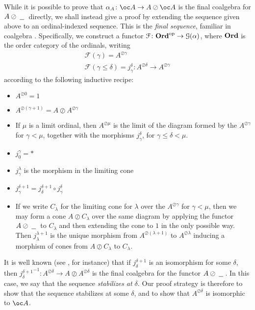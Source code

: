 \documentclass[a4paper,UKenglish]{lipics-v2016}
\theoremstyle{plain}
\theoremstyle{definition}
\newcommand*\from{\colon}
\def \inv {^{-1}}
\newcommand{\sequoid}{\oslash}
\newcommand{\comp}[2]{#1 \circ #2}
\newcommand{\F}{\mathcal F}
\newcommand{\G}{\mathcal G}
\newcommand{\blank}{\;\underline{\hspace{1.5ex}}\;}
\newcommand{\catname}[1]{{\normalfont\textbf{#1}}}
\newcommand{\Ord}{\catname{Ord}}
\newcommand\oppcat[1]{#1^{\mathrm{op}}}
\begin{document}
While it is possible to prove that $\alpha_A\from \oc A\to A\sequoid \oc A$ is the final coalgebra for $A\sequoid\blank$ directly, we shall instead give a proof by extending the sequence given above to an ordinal-indexed sequence.  This is the \emph{final sequence}, familiar in coalgebra \cite{finalseq}.  Specifically, we construct a functor $\F\from\oppcat{\Ord}\to\G(\alpha)$, where $\Ord$ is the order category of the ordinals, writing
\begin{gather*}
  \F(\gamma)=A^{\sequoid\gamma}\\
  \F(\gamma\le\delta)=j_\gamma^\delta\from A^{\sequoid\delta}\to A^{\sequoid\gamma}
\end{gather*}
according to the following inductive recipe:
\begin{itemize}
  \item $A^{\sequoid 0} = 1$
  \item $A^{\sequoid (\gamma + 1)} = A \sequoid A^{\sequoid\gamma}$
  \item If $\mu$ is a limit ordinal, then $A^{\sequoid\mu}$ is the limit of the diagram formed by the $A^{\sequoid\gamma}$ for $\gamma<\mu$, together with the morphisms $j_\gamma^\delta$, for $\gamma\le\delta<\mu$.
  \item $j_0^\gamma=*$
  \item $j_\gamma^\lambda$ is the morphism in the limiting cone
  \item $j_\gamma^{\delta+1} = \comp{j_\delta^{\delta+1}}{j_\gamma^\delta}$
  \item If we write $C_\lambda$ for the limiting cone for $\lambda$ over the $A^{\sequoid\gamma}$ for $\gamma<\mu$, then we may form a cone $A\sequoid C_\lambda$ over the same diagram by applying the functor $A\sequoid\blank$ to $C_\lambda$ and then extending the cone to $1$ in the only possible way.  Then $j_\lambda^{\lambda+1}$ is the unique morphism from $A^{\sequoid(\lambda+1)}$ to $A^{\sequoid\lambda}$ inducing a morphism of cones from $A\sequoid C_\lambda$ to $C_\lambda$.
\end{itemize}

It is well known (see \cite{finalseq}, for instance) that if $j_\delta^{\delta+1}$ is an isomorphism for some $\delta$, then ${j_\delta^{\delta+1}}\inv\from A^{\sequoid\delta}\to A\sequoid A^{\sequoid\delta}$ is the final coalgebra for the functor $A\sequoid\blank$.  In this case, we say that the sequence \emph{stabilizes at $\delta$}.  Our proof strategy is therefore to show that the sequence stabilizes at some $\delta$, and to show that $A^{\sequoid\delta}$ is isomorphic to $\oc A$.
\end{document}
